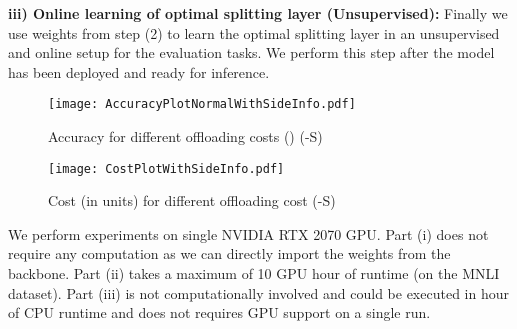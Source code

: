 \textbf{iii) Online learning of optimal splitting layer (Unsupervised):} Finally we use weights from step (2) to learn the optimal splitting layer in an unsupervised and online setup for the evaluation tasks. We perform this step after the model has been deployed and ready for inference.

\begin{figure*}
    \centering \texttt{[image: AccuracyPlotNormalWithSideInfo.pdf]}
    \caption{Accuracy for different offloading costs () (\our{}-S)}
    \label{fig:Accuracy_res_EESPlit s}
\end{figure*}

\begin{figure*}
    \centering \texttt{[image: CostPlotWithSideInfo.pdf]}
    \caption{Cost (in  units) for different offloading cost (\our{}-S)}
    \label{fig:cost_res_EESPLIT-S}
\end{figure*} 

We perform experiments on single NVIDIA RTX 2070 GPU. Part (i) does not require any computation as we can directly import the weights from the backbone. Part (ii) takes a maximum of 10 GPU hour of runtime (on the MNLI dataset). Part (iii) is not computationally involved and could be executed in  hour of CPU runtime and does not requires GPU support on a single run.

